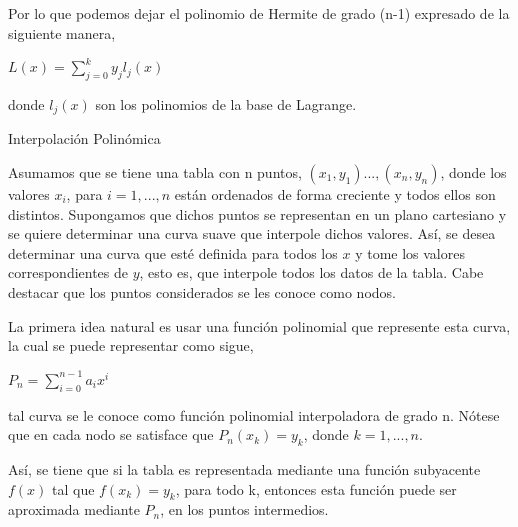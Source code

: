 \hspace{0.4cm} Por lo que podemos dejar el polinomio de Hermite de grado (n-1) expresado de la siguiente manera,

\begin{center}
$\displaystyle{L(x) = \sum_{j=0}^{k} y_{j} l_{j} (x) }$
\end{center}

\noindent donde $l_{j}(x)$ son los polinomios de la base de Lagrange.


Interpolaci\'on Polin\'omica

\hspace{0.4cm}Asumamos que se tiene una tabla con n puntos, $(x_{1},y_{1})...,(x_{n},y_{n})$, donde los valores $x_{i}$, para $i=1,...,n$ est\'an ordenados de forma creciente y todos ellos son distintos. Supongamos que dichos puntos se representan en un plano cartesiano y se quiere determinar una curva suave que interpole dichos valores. As\'i, se desea determinar una curva que est\'e definida para todos los $x$ y tome los valores correspondientes de $y$, esto es, que interpole todos los datos de la tabla. Cabe destacar que los puntos considerados se les conoce como nodos.


\vspace{0.5cm}

\hspace{0.4cm} La primera idea natural es usar una funci\'on polinomial que represente esta curva, la cual se puede representar como sigue,

\vspace{0.5cm}
\begin{center}

$\displaystyle{P_{n} = \sum_{i=0}^{n-1} a_{i}x^{i}}$

\end{center}

\noindent tal curva se le conoce como funci\'on polinomial interpoladora de grado n. N\'otese que en cada nodo se satisface que $P_{n}(x_{k})=y_{k}$, donde $k=1,...,n$.

\vspace{0.5cm}

\hspace{0.4cm} As\'i, se tiene que si la tabla es representada mediante una funci\'on subyacente $f(x)$ tal que $f(x_{k})=y_{k}$, para todo k, entonces esta funci\'on puede ser aproximada mediante $P_{n}$, en los puntos intermedios.


\vspace{0.5cm}

